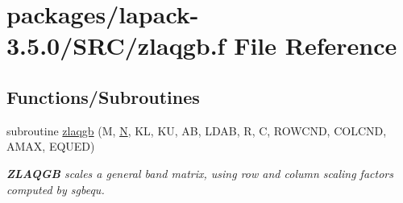 \hypertarget{zlaqgb_8f}{}\section{packages/lapack-\/3.5.0/\+S\+R\+C/zlaqgb.f File Reference}
\label{zlaqgb_8f}
\subsection*{Functions/\+Subroutines}
\begin{DoxyCompactItemize}
\item 
subroutine \hyperlink{group__complex16GBauxiliary_ga0a7b3dc47c271db64d0f1001bcd2cdf7}{zlaqgb} (M, \hyperlink{polmisc_8c_a0240ac851181b84ac374872dc5434ee4}{N}, K\+L, K\+U, A\+B, L\+D\+A\+B, R, C, R\+O\+W\+C\+N\+D, C\+O\+L\+C\+N\+D, A\+M\+A\+X, E\+Q\+U\+E\+D)
\begin{DoxyCompactList}\small\item\em {\bfseries Z\+L\+A\+Q\+G\+B} scales a general band matrix, using row and column scaling factors computed by sgbequ. \end{DoxyCompactList}\end{DoxyCompactItemize}
